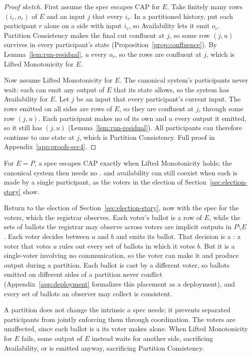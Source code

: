 \begin{proof}[Proof sketch]
First assume the spec escapes CAP for $E$.  Take finitely many rows
$(i_r,o_r)$ of $E$ and an input $j$ that \inrel every $i_r$.  In a partitioned
history, put each participant $r$ alone on a side with input $i_r$, so
Availability lets it emit $o_r$.  Partition Consistency makes the final cut
confluent at $j$, so some row $(j,u)$ survives in every participant's state
(Proposition~\ref{prop:confluence}).  By Lemma~\ref{lem:run-residual}, $u$ \outrel every $o_r$, so the rows are confluent at $j$, which is Lifted Monotonicity for $E$.

Now assume Lifted Monotonicity for $E$.  The canonical system's participants
never wait: each can emit any output of $E$ that its state allows, so the
system has Availability for $E$.  Let $j$ be an input that \inrel every
participant's current input.  The rows emitted on all sides are rows of $E$, so they are confluent at $j$, through some row $(j,u)$.  Each participant makes no
\commitments of its own and $u$ \outrel every output it emitted, so it still
has $(j,u)$ (Lemma~\ref{lem:run-residual}).  All participants can therefore
continue to one state at $j$, which is Partition Consistency.  Full proof in
Appendix~\ref{app:proofs-sec4}.
\end{proof}

For $E=P$, a spec escapes CAP exactly when Lifted Monotonicity holds; the canonical system then needs no \commitment. \Commitments and availability can still coexist when each \commitment is made by a single participant, as the voters in the election of Section~\ref{sec:election-story} show.

Return to the election of Section~\ref{sec:election-story}, now with the spec
for the voters, which the registrar observes.  Each voter's ballot is a row of $E$, while the sets of ballots the
registrar may observe across voters are implicit outputs in $P\setminus E$.
Each voter decides between $a$ and $b$ and emits its ballot.  That decision is
a \commitment: a voter that votes $a$ rules out every set of ballots in which
it votes $b$.  But it is a single-voter \commitment involving no
communication, so the voter can make it and produce output during a partition.
Each ballot is cast by a different voter, so ballots emitted on different
sides of a partition never conflict (Appendix~\ref{app:deployment} formalizes this
placement as a deployment), and every set of ballots an
observer may collect is consistent.

A partition does not change the intrinsic \commitments a spec needs; it
prevents separated participants from jointly enforcing them through
coordination.  The voters are unaffected, since each ballot is a \commitment
its voter makes alone.  When Lifted Monotonicity for $E$ fails, some output of
$E$ instead waits for another side, sacrificing Availability, or is emitted
anyway, sacrificing Partition Consistency.

